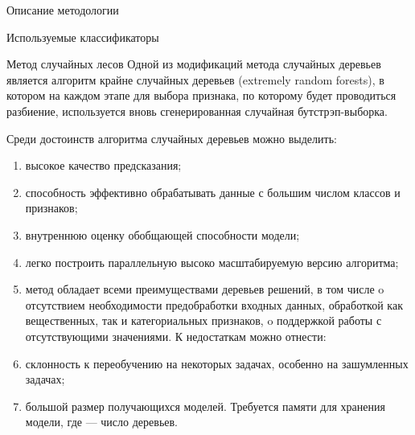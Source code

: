 \begin{section}{Описание методологии}
\begin{subsection}{Используемые классификаторы}
\begin{subsubsection}{Метод случайных лесов}
Одной из модификаций метода случайных деревьев является алгоритм крайне случайных деревьев (extremely random forests), в котором на каждом этапе для выбора признака, по которому будет проводиться разбиение, используется вновь сгенерированная случайная бутстрэп-выборка.

Среди достоинств алгоритма случайных деревьев можно выделить:
\begin{enumerate}
  \item высокое качество предсказания;
  \item способность эффективно обрабатывать данные с большим числом классов и признаков;
  \item внутреннюю оценку обобщающей способности модели;
  \item	легко построить параллельную высоко масштабируемую версию алгоритма;
  \item	метод обладает всеми преимуществами деревьев решений, в том числе
  o	отсутствием необходимости предобработки входных данных, обработкой как вещественных, так и категориальных признаков,
  o	поддержкой работы с отсутствующими значениями.
  К недостаткам можно отнести:
  \item	склонность к переобучению на некоторых задачах, особенно на зашумленных задачах;
  \item	большой размер получающихся моделей. Требуется  памяти для хранения модели, где  — число деревьев.
\end{enumerate}

    \end{subsubsection}

  \end{subsection}

\end{section}
